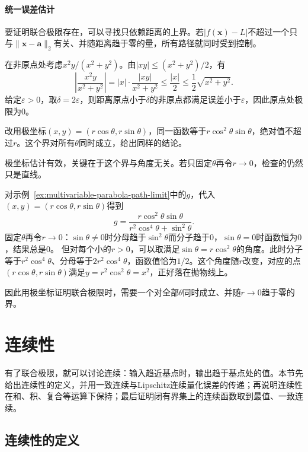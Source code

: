 \paragraph{统一误差估计}
要证明联合极限存在，可以寻找只依赖距离的上界。若$|f(\bm x)-L|$不超过一个只与$\lVert\bm x-\bm a\rVert_2$有关、并随距离趋于零的量，所有路径就同时受到控制。
\begin{example}[用距离上界证明联合极限]
\label{ex:multivariable-distance-bound-limit}
在非原点处考虑$x^2y/(x^2+y^2)$。由$|xy|\leq(x^2+y^2)/2$，有
\[
 \left|\frac{x^2y}{x^2+y^2}\right|
 =|x|\cdot\frac{|xy|}{x^2+y^2}
 \leq \frac{|x|}{2}
 \leq\frac12\sqrt{x^2+y^2}.
\]
给定$\varepsilon>0$，取$\delta=2\varepsilon$，则距离原点小于$\delta$的非原点都满足误差小于$\varepsilon$，因此原点处极限为$0$。

改用极坐标$(x,y)=(r\cos\theta,r\sin\theta)$，同一函数等于$r\cos^2\theta\sin\theta$，绝对值不超过$r$。这个界对所有$\theta$同时成立，给出同样的结论。
\end{example}

极坐标估计有效，关键在于这个界与角度无关。若只固定$\theta$再令$r\to0$，检查的仍然只是直线。
\begin{example}[固定角度的极坐标检验]
\label{ex:multivariable-polar-fixed-angle}
对示例~\ref{ex:multivariable-parabola-path-limit}中的$g$，代入$(x,y)=(r\cos\theta,r\sin\theta)$得到
\[
 g=\frac{r\cos^2\theta\sin\theta}{r^2\cos^4\theta+\sin^2\theta}.
\]
固定$\theta$再令$r\to0$：$\sin\theta\neq0$时分母趋于$\sin^2\theta$而分子趋于$0$，$\sin\theta=0$时函数恒为$0$，结果总是$0$。
但对每个小的$r>0$，可以取满足$\sin\theta=r\cos^2\theta$的角度。此时分子等于$r^2\cos^4\theta$、分母等于$2r^2\cos^4\theta$，函数值恰为$1/2$。这个角度随$r$改变，对应的点$(r\cos\theta,r\sin\theta)$满足$y=r^2\cos^2\theta=x^2$，正好落在抛物线上。
\end{example}

因此用极坐标证明联合极限时，需要一个对全部$\theta$同时成立、并随$r\to0$趋于零的界。

\section{连续性}
\label{sec:multivariable-continuity}

有了联合极限，就可以讨论连续：输入趋近基点时，输出趋于基点处的值。本节先给出连续性的定义，并用一致连续与Lipschitz连续量化误差的传递；再说明连续性在和、积、复合等运算下保持；最后证明闭有界集上的连续函数取到最值、一致连续。

\subsection{连续性的定义}
\label{sec:multivariable-continuity-definition}

